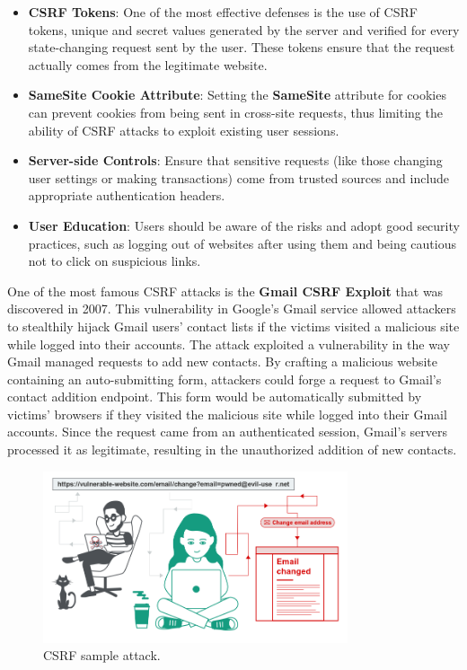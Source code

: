 \documentclass{article}
\begin{document}
\begin{itemize}
	\item \textbf{CSRF Tokens}: One of the most effective defenses is the use of CSRF tokens, unique and secret values generated by the server and verified for every state-changing request sent by the user. These tokens ensure that the request actually comes from the legitimate website.
	\item \textbf{SameSite Cookie Attribute}: Setting the \textbf{SameSite} attribute for cookies can prevent cookies from being sent in cross-site requests, thus limiting the ability of CSRF attacks to exploit existing user sessions.
	\item \textbf{Server-side Controls}: Ensure that sensitive requests (like those changing user settings or making transactions) come from trusted sources and include appropriate authentication headers.
	\item \textbf{User Education}: Users should be aware of the risks and adopt good security practices, such as logging out of websites after using them and being cautious not to click on suspicious links.
\end{itemize}

One of the most famous CSRF  attacks is the \textbf{Gmail CSRF Exploit} that was discovered in 2007. This vulnerability in Google's Gmail service allowed attackers to stealthily hijack Gmail users' contact lists if the victims visited a malicious site while logged into their accounts. The attack exploited a vulnerability in the way Gmail managed requests to add new contacts. By crafting a malicious website containing an auto-submitting form, attackers could forge a request to Gmail's contact addition endpoint. This form would be automatically submitted by victims' browsers if they visited the malicious site while logged into their Gmail accounts. Since the request came from an authenticated session, Gmail's servers processed it as legitimate, resulting in the unauthorized addition of new contacts.

\begin{figure}[ht]
\centering
\includegraphics[width=0.8\textwidth]{images/3.png}
\caption{CSRF sample attack.}
\label{fig:csrf}
\end{figure}
\end{document}
